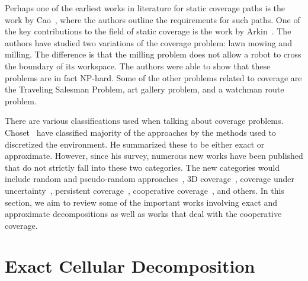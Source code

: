 \documentclass[../main.tex]{subfiles}
\begin{document}
Perhaps one of the earliest works in literature for static coverage paths is the work by Cao~\cite{cao1988region}, where the authors outline the requirements for such paths. One of the key contributions to the field of static coverage is the work by Arkin~\cite{arkin2000approximation}. The authors have studied two variations of the coverage problem: lawn mowing and milling. The difference is that the milling problem does not allow a robot to cross the boundary of its workspace. The authors were able to show that these problems are in fact NP-hard. Some of the other problems related to coverage are the Traveling Salesman Problem, art gallery problem, and a watchman route problem.

There are various classifications used when talking about coverage problems. Choset~\cite{choset2000coverage} have classified majority of the approaches by the methods used to discretized the environment. He summarized these to be either exact or approximate. However, since his survey, numerous new works have been published that do not strictly fall into these two categories. The new categories would include random and pseudo-random approaches~\cite{gage1994randomized,balch2000case}, 3D coverage~\cite{hert1996terrain,atkar2005uniform}, coverage under uncertainty~\cite{bretl2013robust}, persistent coverage~\cite{lin2015optimal}, cooperative coverage~\cite{rekleitis2008efficient}, and others. In this section, we aim to review some of the important works involving exact and approximate decompositions as well as works that deal with the cooperative coverage.


\section{Exact Cellular Decomposition}
\label{section:exact_cellular_decomposition}
\end{document}
